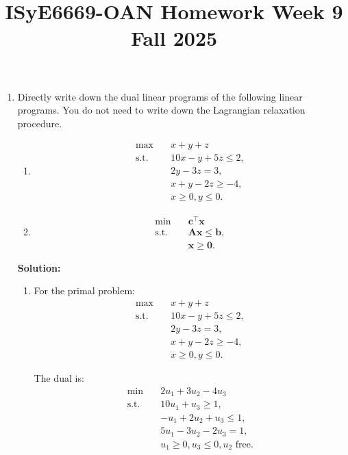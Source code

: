 \documentclass[11pt]{article}
\title{ISyE6669-OAN Homework Week 9\\
Fall 2025}
\author{}
\date{}
\def \A{\bm{A}}
\def \b{\bm{b}}
\def \c{\bm{c}}
\def \x{\bm{x}}
\def \0{\bm{0}}
\begin{document}
\maketitle

\begin{enumerate}

    \item Directly write down the dual linear programs of the following linear programs. You do not need to write down the Lagrangian relaxation procedure.
    \begin{enumerate}
        \item \begin{align*}
                \max \quad & x + y + z \\
                \text{s.t.}\quad & 10x - y + 5z \le 2, \\
                & 2y - 3z = 3,\\
                & x + y - 2z \ge -4,\\
                & x\ge 0, y\le 0.
              \end{align*}
    
        \item \begin{align*}
            \min \quad & \c^\top \x \\
            \text{s.t.}\quad & \A\x \le \b, \\
            & \x\ge \0.
        \end{align*}
    \end{enumerate}

    \textbf{Solution:}
    
    \begin{enumerate}
        \item For the primal problem:
              \begin{align*}
                \max \quad & x + y + z \\
                \text{s.t.}\quad & 10x - y + 5z \le 2, \\
                & 2y - 3z = 3,\\
                & x + y - 2z \ge -4,\\
                & x\ge 0, y\le 0.
              \end{align*}
              
              The dual is:
              \begin{align*}
                \min \quad & 2u_1 + 3u_2 - 4u_3 \\
                \text{s.t.}\quad & 10u_1 + u_3 \ge 1, \\
                & -u_1 + 2u_2 + u_3 \le 1,\\
                & 5u_1 - 3u_2 - 2u_3 = 1,\\
                & u_1 \ge 0, u_3 \le 0, u_2 \text{ free}.
              \end{align*}
    

\end{enumerate}
\end{enumerate}
\end{document}
